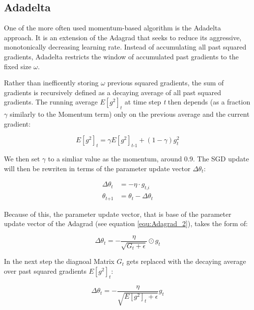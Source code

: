 \documentclass[12pt,oneside,a4paper,parskip]{scrbook}
\begin{document}
\subsection{Adadelta}
One of the more often used momentum-based algorithm is the Adadelta approach. It is an extension of the Adagrad that 
seeks to reduce its aggressive, monotonically decreasing learning rate. Instead of accumulating all past squared gradients, 
Adadelta restricts the window of accumulated past gradients to the fixed size $\omega$.  

Rather than inefficently storing $\omega$ previous squared gradients, the sum of gradients is recursively defined as a 
decaying average of all past squared gradients. The running average $\textit{E}[\textit{g}^2]_t$  at time step \textit{t} 
then depends (as a fraction $\gamma $ similarly to the Momentum term) only on the previous average and the 
current gradient:

\begin{equation}
\textit{E}[\textit{g}^2]_t = \gamma\textit{E}[\textit{g}^2]_\textit{t-1} + (1-\gamma)\textit{g}^2_t
\label{equ:adadelta_1}
\end{equation}

We then set $\gamma$ to a simliar value as the momentum, around 0.9. The SGD update will then be rewriten in terms of the 
parameter update vector $\Delta\theta_\textit{t}$:

\begin{equation}
  \begin{split}
    \Delta\theta_\textit{t} &= -\eta \cdot \textit{g}_\textit{t,i} \\
    \theta_\textit{t+1} &= \theta_\textit{t} - \Delta\theta_\textit{t}
  \end{split}
\end{equation}

Because of this, the parameter update vector, that is base of the parameter update vector of the Adagrad (see equation \ref{equ:Adagrad_2}), 
takes the form of:

\begin{equation}
  \Delta\theta_\textit{t} = -\frac{\eta}{\sqrt{\textit{G}_\textit{t} + \epsilon}} \odot \textit{g}_\textit{t}
\end{equation}

In the next step the diagnoal Matrix $\textit{G}_t$ gets replaced with the decaying average over past squared gradients 
$\textit{E}[\textit{g}^2]_\textit{t}$:

\begin{equation}
  \Delta\theta_\textit{t} = -\frac{\eta}{\sqrt{\textit{E}[\textit{g}^2]_\textit{t} + \epsilon}} \textit{g}_\textit{t}
\end{equation}
\end{document}
